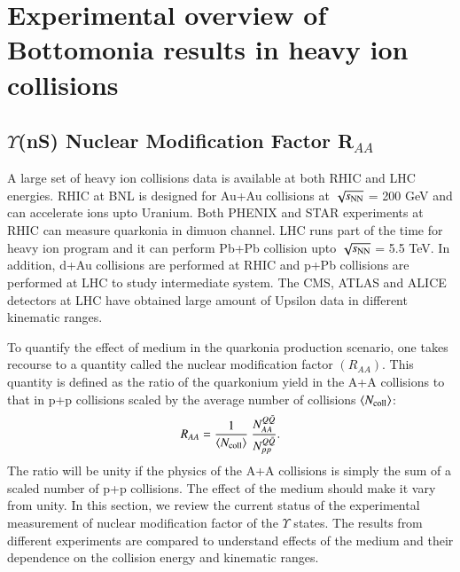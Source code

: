 \section{Experimental overview of Bottomonia results in heavy ion collisions}

\subsection{$\Upsilon$(nS) Nuclear Modification Factor R$_{AA}$}
A large set of heavy ion collisions data is available at both RHIC and LHC energies.
RHIC at BNL is designed for Au+Au collisions
at $\sqrt{s_{\rm NN}}$ = 200 GeV and can accelerate ions upto Uranium. Both PHENIX and
STAR experiments at RHIC can measure quarkonia in dimuon channel. 
LHC runs part of the time for heavy ion program and it
can perform Pb+Pb collision upto $\sqrt{s_{\rm NN}}$ = 5.5 TeV. In addition, d+Au collisions
are performed at RHIC and p+Pb collisions are performed at LHC to study
intermediate system. The CMS, ATLAS and ALICE detectors at LHC have obtained large
amount of Upsilon data in different kinematic ranges.

To quantify the effect of medium in the quarkonia production scenario, one takes
recourse to a quantity called the nuclear modification factor $(R_{AA})$. This quantity
is defined as the ratio of the quarkonium yield in the A+A collisions to that
in p+p collisions scaled by the average number of collisions $\langle N_{\rm coll} \rangle$: 
 \begin{equation}
 R_{AA} = \frac{1}{\langle N_{\rm coll} \rangle} \ \frac {N^{Q{\bar Q}}_{AA}} {N^{Q{\bar Q}}_{pp}}.
 \end{equation}
 The ratio will be unity if the physics of the A+A collisions is simply the sum of
 a scaled number of p+p collisions. The effect of the medium should make it vary from unity. 
In this section, we review the current status of the experimental measurement
of nuclear modification factor 
of the $\Upsilon$ states. The results from different experiments are compared to
understand effects of the medium and their dependence on the collision energy
and kinematic ranges. 

